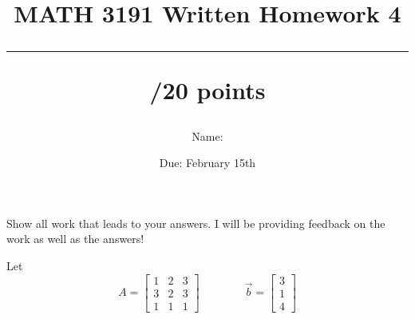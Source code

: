 \documentclass{exam}
\title{MATH 3191 Written Homework 4\\\rule{30pt}{1pt}/20 points}
\author{Name: \rule{150pt}{1pt}}
\date{Due: February 15th}
\begin{document}
\maketitle
Show all work that leads to your answers. I will be providing feedback on the work as well as the answers!
\begin{questions}
    \question[20] Let
    \[
        A = \begin{bmatrix}
            1 & 2 & 3\\
            3 & 2 & 3\\
            1 & 1 & 1
            \end{bmatrix}\qquad\qquad \vec{b} = \begin{bmatrix}
            3\\1\\4
            \end{bmatrix}
    \]
\end{questions}
\end{document}
